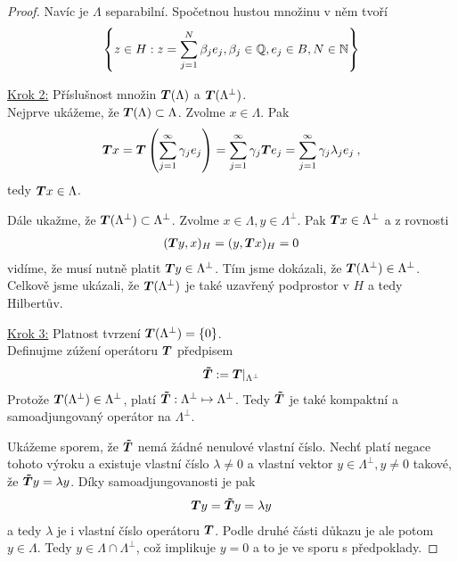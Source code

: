 \begin{proof}
Navíc je $\Lambda$ separabilní. Spočetnou hustou množinu v něm tvoří \begin{align*}
    \left\lbrace z \in H: z = \sum_{j=1}^N \beta_j e_j, \beta_j \in \mathbb{Q} , e_j \in B, N \in \mathbb{N} \right\rbrace
\end{align*}

\underline{Krok 2:} Příslušnost množin $\boldsymbol{T}(\Lambda)$ a $\boldsymbol{T}(\Lambda^\bot)$. \\
Nejprve ukážeme, že $\boldsymbol{T}(\Lambda) \subset \Lambda$. Zvolme $x \in \Lambda$. Pak \begin{align*}
    \boldsymbol{T} x = \boldsymbol{T} \left(\sum_{j=1}^\infty \gamma_j e_j \right) = \sum_{j=1}^\infty \gamma_j \boldsymbol{T} e_j = \sum_{j=1}^\infty \gamma_j \lambda_j e_j \:,
\end{align*}
tedy $\boldsymbol{T} x \in \Lambda$. 

Dále ukažme, že $\boldsymbol{T}(\Lambda^\bot) \subset \Lambda^\bot$. Zvolme $x \in \Lambda, y \in \Lambda^\bot$. Pak $\boldsymbol{T} x \in \Lambda^\bot$ a z rovnosti \begin{align*}
    (\boldsymbol{T} y,x)_H = (y, \boldsymbol{T} x)_H =0
\end{align*}
vidíme, že musí nutně platit $\boldsymbol{T} y \in \Lambda^\bot$. Tím jsme dokázali, že $\boldsymbol{T}(\Lambda^\bot) \in \Lambda^{\bot}$. Celkově jsme ukázali, že  $\boldsymbol{T}(\Lambda^\bot)$ je také uzavřený podprostor v $H$ a tedy Hilbertův.

\underline{Krok 3:} Platnost tvrzení $\boldsymbol{T}(\Lambda^\bot) = \lbrace 0 \rbrace$. \\
Definujme zúžení operátoru $\boldsymbol{T}$ předpisem \begin{align*}
    \boldsymbol{\tilde T} := \boldsymbol{T}\rvert_{\Lambda^\bot}
\end{align*}
Protože $\boldsymbol{T}(\Lambda^\bot) \in \Lambda^{\bot}$, platí $\boldsymbol{\tilde T} : \Lambda^{\bot} \mapsto \Lambda^{\bot}$. Tedy $\boldsymbol{\tilde T}$ je také kompaktní a samoadjungovaný operátor na $\Lambda^{\bot}$.

Ukážeme sporem, že $\boldsymbol{\tilde T}$ nemá žádné nenulové vlastní číslo. Nechť platí negace tohoto výroku a existuje vlastní číslo $\lambda \neq 0$ a vlastní vektor $y \in \Lambda^{\bot} , y \neq 0$ takové, že $ \boldsymbol{\tilde T} y = \lambda y$. Díky samoadjungovanosti je pak \begin{align*}
    \boldsymbol{T} y = \boldsymbol{\tilde T} y = \lambda y
\end{align*}
a tedy $\lambda$ je i vlastní číslo operátoru $\boldsymbol{T}$. Podle druhé části důkazu je ale potom $y \in \Lambda$. Tedy $y \in \Lambda \cap \Lambda^\bot$, což implikuje $y=0$ a to je ve sporu s předpoklady.


\end{proof}
